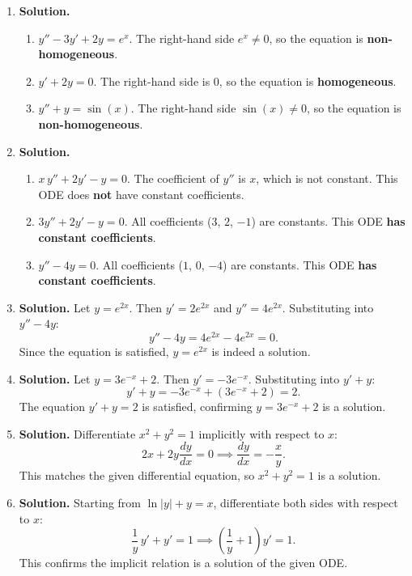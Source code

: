 \begin{enumerate}
\item \textbf{Solution.}
\begin{enumerate}
\item $y''-3y'+2y=e^x$. The right-hand side $e^x\neq 0$, so the equation is \textbf{non-homogeneous}.
\item $y'+2y=0$. The right-hand side is $0$, so the equation is \textbf{homogeneous}.
\item $y''+y=\sin(x)$. The right-hand side $\sin(x)\neq 0$, so the equation is \textbf{non-homogeneous}.
\end{enumerate}

\item \textbf{Solution.}
\begin{enumerate}
\item $x\,y''+2y'-y=0$. The coefficient of $y''$ is $x$, which is not constant. This ODE does \textbf{not} have constant coefficients.
\item $3y''+2y'-y=0$. All coefficients ($3$, $2$, $-1$) are constants. This ODE \textbf{has constant coefficients}.
\item $y''-4y=0$. All coefficients ($1$, $0$, $-4$) are constants. This ODE \textbf{has constant coefficients}.
\end{enumerate}

\item \textbf{Solution.}
Let $y=e^{2x}$. Then $y'=2e^{2x}$ and $y''=4e^{2x}$. Substituting into $y''-4y$:
\[
y''-4y = 4e^{2x}-4e^{2x}=0.\]
Since the equation is satisfied, $y=e^{2x}$ is indeed a solution.

\item \textbf{Solution.}
Let $y=3e^{-x}+2$. Then $y'=-3e^{-x}$. Substituting into $y'+y$:
\[
y'+y = -3e^{-x}+(3e^{-x}+2) = 2.\]
The equation $y'+y=2$ is satisfied, confirming $y=3e^{-x}+2$ is a solution.

\item \textbf{Solution.}
Differentiate $x^2+y^2=1$ implicitly with respect to $x$:
\[
2x+2y\frac{dy}{dx}=0 \implies \frac{dy}{dx}=-\frac{x}{y}.\]
This matches the given differential equation, so $x^2+y^2=1$ is a solution.

\item \textbf{Solution.}
Starting from $\ln|y|+y=x$, differentiate both sides with respect to $x$:
\[
\frac{1}{y}\,y' + y' = 1 \implies \left(\frac{1}{y}+1\right)y' = 1.\]
This confirms the implicit relation is a solution of the given ODE.


\end{enumerate}
